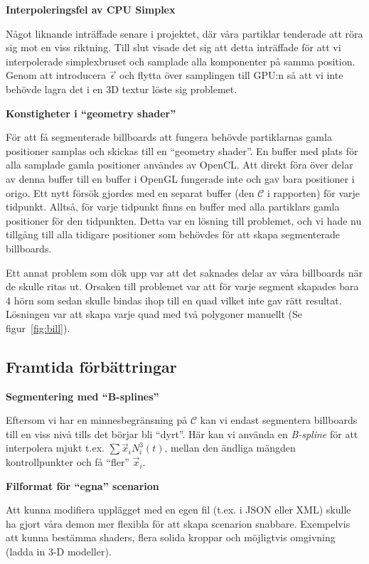 \documentclass[a4paper]{article}
\begin{document}
\begin{multicols}{2}
            \textbf{Interpoleringsfel av CPU Simplex}

            Något liknande inträffade senare i projektet, där våra partiklar tenderade att röra sig mot en viss riktning. Till slut visade det sig att detta inträffade för att vi interpolerade simplexbruset och samplade alla komponenter på samma position. Genom att introducera $\vec{\epsilon}$ och flytta över samplingen till GPU:n så att vi inte behövde lagra det i en 3D textur löste sig problemet.

            \textbf{Konstigheter i ``geometry shader''}
            
            För att få segmenterade billboards att fungera behövde partiklarnas gamla positioner samplas och skickas till en ``geometry shader''. En buffer med plats för alla samplade gamla positioner användes av OpenCL. Att direkt föra över delar av denna buffer till en buffer i OpenGL fungerade inte och gav bara positioner i origo. Ett nytt försök gjordes med en separat buffer (den \(\mathcal{C}\) i rapporten) för varje tidpunkt. Alltså, för varje tidpunkt finns en buffer med alla partiklars gamla positioner för den tidpunkten. Detta var en lösning till problemet, och vi hade nu tillgång till alla tidigare positioner som behövdes för att skapa segmenterade billboards.
            
            Ett annat problem som dök upp var att det saknades delar av våra billboards när de skulle ritas ut. Orsaken till problemet var att för varje segment skapades bara 4 hörn som sedan skulle bindas ihop till en quad vilket inte gav rätt resultat. Lösningen var att skapa varje quad med två polygoner manuellt (Se figur~\ref{fig:bill}). 

        \subsection{Framtida förbättringar}

            \textbf{Segmentering med ``B-splines''}

            Eftersom vi har en minnesbegränsning på \(\mathcal{C}\) kan vi endast segmentera billboards till en viss nivå tills det börjar bli ``dyrt''. Här kan vi använda en \emph{B-spline} för att interpolera mjukt t.ex. \(\sum \vec{x}_i N^3_i(t)\), mellan den ändliga mängden kontrollpunkter och få ``fler'' \(\vec{x}_i\).

            \textbf{Filformat för ``egna'' scenarion}

            Att kunna modifiera upplägget med en egen fil (t.ex. i JSON eller XML) skulle ha gjort våra demon mer flexibla för att skapa scenarion snabbare. Exempelvis att kunna bestämma shaders, flera solida kroppar och möjligtvis omgivning (ladda in 3-D modeller).


\end{multicols}
\end{document}
